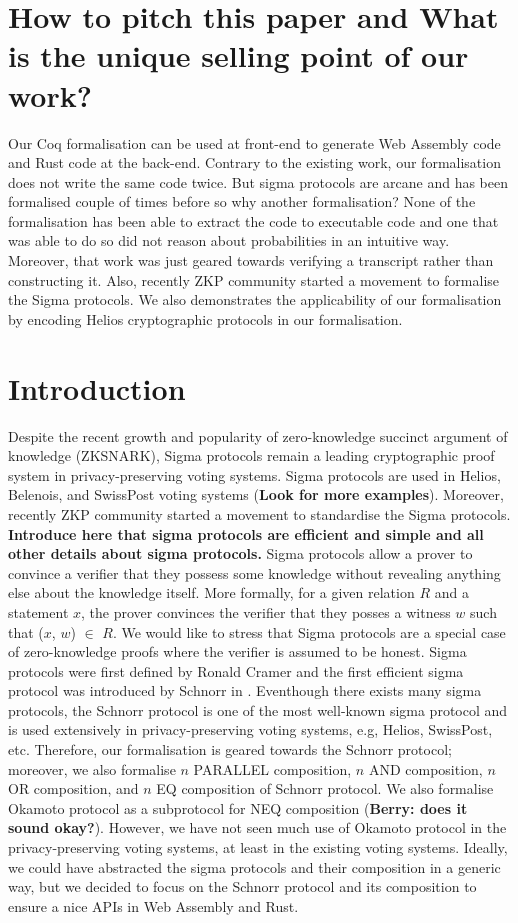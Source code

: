 \documentclass[sigconf]{acmart}
\begin{document}
\section{How to pitch this paper and What is the unique selling point of our work?}
Our Coq formalisation can be used at front-end to generate Web Assembly code and 
Rust code at the back-end. Contrary to the existing work, our formalisation
does not write the same code twice. But sigma protocols are arcane and has 
been formalised couple of times before so why another formalisation?
None of the formalisation has been able to extract the code to executable code 
and one that was able to do so did not reason about probabilities in an intuitive way.
Moreover, that work was just geared towards verifying a transcript rather than
constructing it. Also, recently ZKP community started a movement to 
formalise the Sigma protocols. We also demonstrates the 
applicability of our formalisation by encoding Helios cryptographic protocols
in our formalisation. 




\section{Introduction}
Despite the recent growth and popularity of zero-knowledge succinct 
argument of knowledge (ZKSNARK), Sigma protocols remain a
leading cryptographic proof system in privacy-preserving voting systems. 
Sigma protocols are used in Helios, Belenois, and SwissPost voting systems (\textbf{Look for more examples}). 
Moreover, recently ZKP community started a movement to standardise
the Sigma protocols. \textbf{Introduce here that sigma protocols are efficient and simple and all 
other details about sigma protocols.} Sigma protocols allow a prover to convince a verifier that 
they possess some knowledge without revealing anything else about the knowledge itself.  
More formally, for a given relation $R$ and a statement $x$, the prover convinces the verifier
that they posses a witness $w$ such that ($x$, $w$) $\in$ $R$. We would like to stress that
Sigma protocols are a special case of zero-knowledge proofs where the verifier is 
assumed to be honest. Sigma protocols were first defined by Ronald Cramer \cite{cramer1996modular} and the 
first efficient sigma protocol was introduced by Schnorr in \cite{schnorr1991efficient}. 
Eventhough there exists many sigma protocols, the Schnorr protocol is one of the most well-known
sigma protocol and is used extensively in privacy-preserving voting systems, e.g, Helios, SwissPost, etc. 
Therefore, our formalisation is geared towards the Schnorr protocol; moreover, we 
also formalise $n$ PARALLEL composition, $n$ AND composition, $n$ OR composition, 
and $n$ EQ composition of Schnorr protocol. We also formalise Okamoto protocol as a subprotocol 
for NEQ composition (\textbf{Berry: does it sound okay?}). However, we have not seen 
much use of Okamoto protocol in the privacy-preserving voting systems, 
at least in the existing voting systems. Ideally, we could have abstracted the sigma protocols and their composition in a generic way,
but we decided to focus on the Schnorr protocol and its composition to ensure a nice APIs in 
Web Assembly and Rust.
\end{document}
